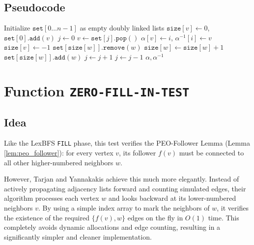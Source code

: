 \subsection{Pseudocode}

\begin{algorithm}[H]
\caption{Maximum Cardinality Search (\texttt{MCS})}
\begin{algorithmic}[1]
    \State Initialize $\texttt{set}[0 \dots n-1]$ as empty doubly linked lists
        \State $\texttt{size}[v] \gets 0$, $\texttt{set}[0].\texttt{add}(v)$
    \EndFor
    \State $j \gets 0$
        \State $v \gets \texttt{set}[j].\texttt{pop}()$
        \State $\alpha[v] \gets i$, $\alpha^{-1}[i] \gets v$
        \State $\texttt{size}[v] \gets -1$ 
             
                \State $\texttt{set}[\texttt{size}[w]].\texttt{remove}(w)$
                \State $\texttt{size}[w] \gets \texttt{size}[w] + 1$
                \State $\texttt{set}[\texttt{size}[w]].\texttt{add}(w)$
            \EndIf
        \EndFor
        \State $j \gets j + 1$
            \State $j \gets j - 1$
        \EndWhile
    \EndFor
    \State \Return $\alpha, \alpha^{-1}$
\EndFunction
\end{algorithmic}
\end{algorithm}


\section{Function \texttt{ZERO-FILL-IN-TEST}}

\subsection{Idea}
Like the LexBFS \texttt{FILL} phase, this test verifies the PEO-Follower Lemma (Lemma \ref{lem:peo_follower}): for every vertex $v$, its follower $f(v)$ must be connected to all other higher-numbered neighbors $w$. 

However, Tarjan and Yannakakis achieve this much more elegantly. Instead of actively propagating adjacency lists forward and counting simulated edges, their algorithm processes each vertex $w$ and looks backward at its lower-numbered neighbors $v$. By using a simple index array to mark the neighbors of $w$, it verifies the existence of the required $\{f(v), w\}$ edges on the fly in $O(1)$ time. This completely avoids dynamic allocations and edge counting, resulting in a significantly simpler and cleaner implementation.

